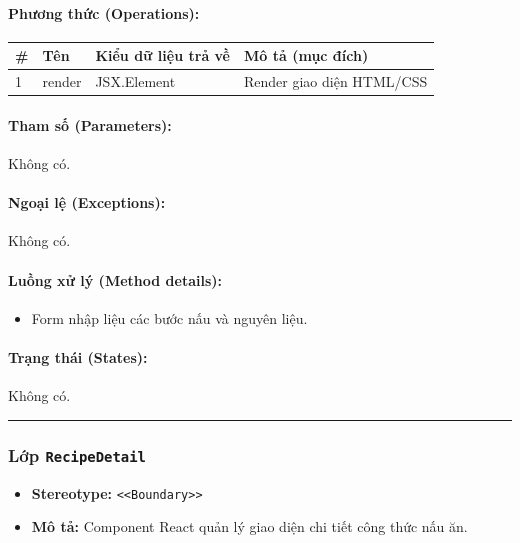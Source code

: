 \documentclass[12pt,a4paper]{article}
\begin{document}
\paragraph{Phương thức (Operations):}
\begin{longtable}{|p{0.6cm}|p{5.0cm}|p{2.8cm}|p{5.4cm}|}
\hline
\textbf{\#} & \textbf{Tên} & \textbf{Kiểu dữ liệu trả về} & \textbf{Mô tả (mục đích)} \\ \hline
\endhead
1 & render & JSX.Element & Render giao diện HTML/CSS \\ \hline
\end{longtable}

\paragraph{Tham số (Parameters):}
Không có.

\paragraph{Ngoại lệ (Exceptions):}
Không có.

\paragraph{Luồng xử lý (Method details):}
\begin{itemize}[leftmargin=*]
    \item Form nhập liệu các bước nấu và nguyên liệu.
\end{itemize}


\paragraph{Trạng thái (States):}
Không có.

\vskip 0.5cm
\noindent\rule{\textwidth}{0.5pt}
\vskip 0.5cm

\subsubsection{Lớp \texttt{RecipeDetail}}

\begin{itemize}[leftmargin=*]
    \item \textbf{Stereotype:} \texttt{\textless{}\textless{}Boundary\textgreater{}\textgreater{}}
    \item \textbf{Mô tả:} Component React quản lý giao diện chi tiết công thức nấu ăn.
\end{itemize}
\end{document}
